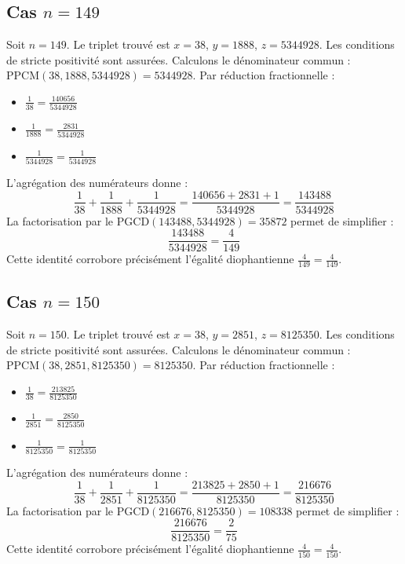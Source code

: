 \documentclass[11pt,a4paper]{article}
\begin{document}
\subsection{Cas $n = 149$}
Soit $n = 149$. Le triplet trouvé est $x = 38$, $y = 1888$, $z = 5344928$.
Les conditions de stricte positivité sont assurées.
Calculons le dénominateur commun : $\text{PPCM}(38, 1888, 5344928) = 5344928$.
Par réduction fractionnelle :
\begin{itemize}
    \item $\frac{1}{38} = \frac{140656}{5344928}$
    \item $\frac{1}{1888} = \frac{2831}{5344928}$
    \item $\frac{1}{5344928} = \frac{1}{5344928}$
\end{itemize}
L'agrégation des numérateurs donne :
$$ \frac{1}{38} + \frac{1}{1888} + \frac{1}{5344928} = \frac{140656 + 2831 + 1}{5344928} = \frac{143488}{5344928} $$
La factorisation par le $\text{PGCD}(143488, 5344928) = 35872$ permet de simplifier :
$$ \frac{143488}{5344928} = \frac{4}{149} $$
Cette identité corrobore précisément l'égalité diophantienne $\frac{4}{149} = \frac{4}{149}$.

\subsection{Cas $n = 150$}
Soit $n = 150$. Le triplet trouvé est $x = 38$, $y = 2851$, $z = 8125350$.
Les conditions de stricte positivité sont assurées.
Calculons le dénominateur commun : $\text{PPCM}(38, 2851, 8125350) = 8125350$.
Par réduction fractionnelle :
\begin{itemize}
    \item $\frac{1}{38} = \frac{213825}{8125350}$
    \item $\frac{1}{2851} = \frac{2850}{8125350}$
    \item $\frac{1}{8125350} = \frac{1}{8125350}$
\end{itemize}
L'agrégation des numérateurs donne :
$$ \frac{1}{38} + \frac{1}{2851} + \frac{1}{8125350} = \frac{213825 + 2850 + 1}{8125350} = \frac{216676}{8125350} $$
La factorisation par le $\text{PGCD}(216676, 8125350) = 108338$ permet de simplifier :
$$ \frac{216676}{8125350} = \frac{2}{75} $$
Cette identité corrobore précisément l'égalité diophantienne $\frac{4}{150} = \frac{4}{150}$.
\end{document}

